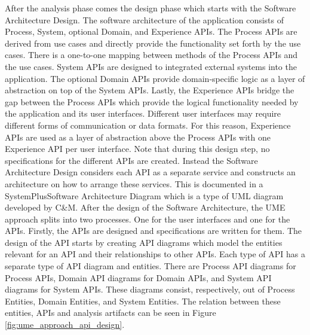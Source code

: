 After the analysis phase comes the design phase which starts with the Software Architecture Design.
The software architecture of the application consists of Process, System, optional Domain, and Experience APIs.
The Process APIs are derived from use cases and directly provide the functionality set forth
by the use cases. There is a one-to-one mapping between methods of the Process APIs and the use cases.
System APIs are designed to integrated external systems into the application.
The optional Domain APIs provide domain-specific logic as a layer of abstraction
on top of the System APIs. Lastly, the Experience APIs
bridge the gap between the Process APIs which provide the logical functionality needed by
the application and its user interfaces. Different user interfaces may require
different forms of communication or data formats. For this reason, Experience APIs
are used as a layer of abstraction above the Process APIs with one Experience API
per user interface.
Note that during this design step, no specifications for the different APIs are created.
Instead the Software Architecture Design considers each API as a separate service
and constructs an architecture on how to arrange these services.
This is documented in a SystemPlusSoftware Architecture Diagram which is a type of UML
diagram developed by C\&M. %
After the design of the Software Architecture, the UME approach splits into two processes.
One for the user interfaces and one for the APIs.
Firstly, the APIs are designed and specifications are written for them.
The design of the API starts by creating API diagrams which model the entities relevant
for an API and their relationships to other APIs. Each type of API has a separate
type of API diagram and entities. There are Process API diagrams for Process APIs,
Domain API diagrams for Domain APIs, and System API diagrams for System APIs.
These diagrams consist, respectively, out of Process Entities, Domain Entities,
and System Entities. The relation between these entities, APIs and analysis artifacts
can be seen in Figure \ref{fig:ume_approach_api_design}.

